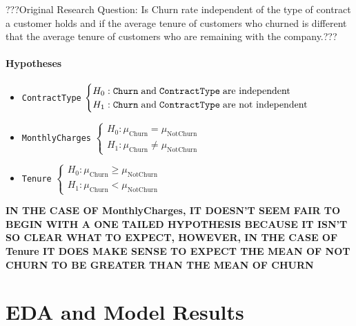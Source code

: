\documentclass[man, floatsintext]{apa6}
\begin{document}
???Original Research Question:
Is Churn rate independent of the type of contract a customer holds and if the average tenure of customers who churned is different that the average tenure of customers who are remaining with the company.???

\paragraph{Hypotheses}

\begin{itemize}
\item \texttt{ContractType} $\begin{cases}
H_0: \texttt{Churn} \hspace{1mm} \text{and}  \hspace{1mm} \texttt{ContractType} \hspace{1mm} \text{are independent} \\
H_1: \texttt{Churn} \hspace{1mm} \text{and} \hspace{1mm} \texttt{ContractType} \hspace{1mm} \text{are not independent}
\end{cases}$
\item \texttt{MonthlyCharges} $\begin{cases}
H_0: \mu_{\text{Churn}} = \mu_{\text{NotChurn}} \\
H_1: \mu_{\text{Churn}} \neq \mu_{\text{NotChurn}}
\end{cases}$ 
\item \texttt{Tenure} $\begin{cases}
H_0: \mu_{\text{Churn}} \geq \mu_{\text{NotChurn}} \\
H_1: \mu_{\text{Churn}} < \mu_{\text{NotChurn}}
\end{cases}$ 
\end{itemize}

\textbf{IN THE CASE OF MonthlyCharges, IT DOESN'T SEEM FAIR TO BEGIN WITH A ONE TAILED HYPOTHESIS BECAUSE IT ISN'T SO CLEAR WHAT TO EXPECT, HOWEVER, IN THE CASE OF Tenure IT DOES MAKE SENSE TO EXPECT THE MEAN OF NOT CHURN TO BE GREATER THAN THE MEAN OF CHURN}



\section{EDA and Model Results} 
\end{document}

